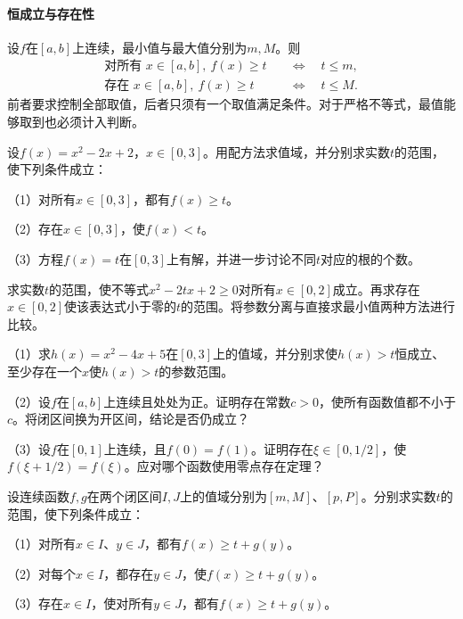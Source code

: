 \paragraph{恒成立与存在性} \mbox{}

设\(f\)在\([a,b]\)上连续，最小值与最大值分别为\(m,M\)。则
\begin{equation*}
 \begin{aligned}
 \text{对所有 }x\in[a,b],\ f(x)\ge t
 &\quad\Longleftrightarrow\quad t\le m,\\
 \text{存在 }x\in[a,b],\ f(x)\ge t
 &\quad\Longleftrightarrow\quad t\le M.
 \end{aligned}
\end{equation*}
前者要求控制全部取值，后者只须有一个取值满足条件。对于严格不等式，最值能够取到也必须计入判断。

\begin{example}
设\(f(x)=x^2-2x+2\)，\(x\in[0,3]\)。用配方法求值域，并分别求实数\(t\)的范围，使下列条件成立：

（1）对所有\(x\in[0,3]\)，都有\(f(x)\ge t\)。

（2）存在\(x\in[0,3]\)，使\(f(x)<t\)。

（3）方程\(f(x)=t\)在\([0,3]\)上有解，并进一步讨论不同\(t\)对应的根的个数。
\end{example}

\begin{example}
求实数\(t\)的范围，使不等式\(x^2-2tx+2\ge0\)对所有\(x\in[0,2]\)成立。再求存在\(x\in[0,2]\)使该表达式小于零的\(t\)的范围。将参数分离与直接求最小值两种方法进行比较。
\end{example}

\begin{exercise}
\mbox{}\par\nobreak

（1）求\(h(x)=x^2-4x+5\)在\([0,3]\)上的值域，并分别求使\(h(x)>t\)恒成立、至少存在一个\(x\)使\(h(x)>t\)的参数范围。

（2）设\(f\)在\([a,b]\)上连续且处处为正。证明存在常数\(c>0\)，使所有函数值都不小于\(c\)。将闭区间换为开区间，结论是否仍成立？

（3）设\(f\)在\([0,1]\)上连续，且\(f(0)=f(1)\)。证明存在\(\xi\in[0,1/2]\)，使\(f(\xi+1/2)=f(\xi)\)。应对哪个函数使用零点存在定理？
\end{exercise}

\begin{example}
设连续函数\(f,g\)在两个闭区间\(I,J\)上的值域分别为\([m,M]\)、\([p,P]\)。分别求实数\(t\)的范围，使下列条件成立：

（1）对所有\(x\in I\)、\(y\in J\)，都有\(f(x)\ge t+g(y)\)。

（2）对每个\(x\in I\)，都存在\(y\in J\)，使\(f(x)\ge t+g(y)\)。

（3）存在\(x\in I\)，使对所有\(y\in J\)，都有\(f(x)\ge t+g(y)\)。
\end{example}

